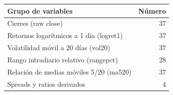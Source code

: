 \begin{tabular}{p{}r}
\toprule
                     Grupo de variables &  Número \\
\midrule
                    Cierres (raw close) &      37 \\
Retornos logarítmicos a 1 día (logret1) &      37 \\
    Volatilidad móvil a 20 días (vol20) &      37 \\
  Rango intradiario relativo (rangepct) &      28 \\
Relación de medias móviles 5/20 (ma520) &      37 \\
             Spreads y ratios derivados &       4 \\
\bottomrule
\end{tabular}
